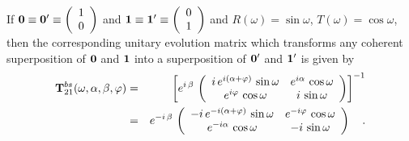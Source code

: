 If
$ {\bf 0}  \equiv    {\bf 0}' \equiv
\left(
\begin{array}{c}
1 \\
0
 \end{array}
\right)
$
and
$ {\bf 1} \equiv    {\bf 1}' \equiv
\left(
\begin{array}{c}
0 \\
1
 \end{array}
\right)
$ and $R(\omega )=\sin \omega $, $T(\omega )=\cos \omega$, then
the corresponding unitary evolution matrix
which transforms any coherent superposition of $ {\bf 0} $
and $ {\bf 1} $
into a superposition of
$ {\bf 0}' $
and
$ {\bf 1}' $
 is given by
\begin{eqnarray}
{\bf T}_{21}^{bs} (\omega ,\alpha ,\beta ,\varphi )&=&
\left[
e^{i\, \beta }\,
\left(
\begin{array}{cc}
i \, e^{i(\alpha +\varphi)} \,  \sin \omega  &e^{i\alpha }\,
  \cos \omega
\\ e^{i\varphi }\, \cos \omega  & i\,\sin \omega
 \end{array}
\right)
\right]^{-1}
\nonumber \\
&=&
e^{-i\, \beta }\,
\left(
\begin{array}{cc}
-i \, e^{-i(\alpha +\varphi)} \,  \sin \omega  &e^{-i\varphi }\,
  \cos \omega
\\ e^{-i\alpha }\, \cos \omega  & -i\,\sin \omega
 \end{array}
\right)
 \quad .
\label{e:quid1}
\end{eqnarray}


